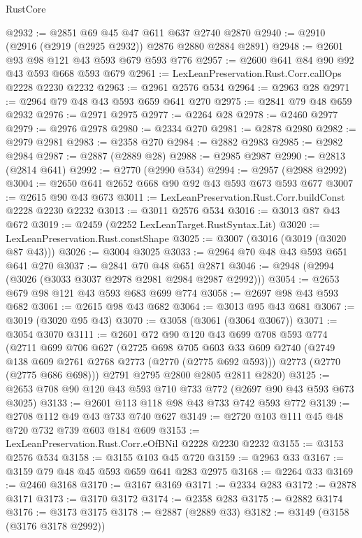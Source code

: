 \begin{lexlean}{RustCore}
\begin{coremodule}
@2932 := @2851 @69 @45 @47 @611 @637 @2740 @2870
@2940 := @2910 (@2916 (@2919 (@2925 @2932)) @2876 @2880 @2884 @2891)
@2948 := @2601 @93 @98 @121 @43 @593 @679 @593 @776
@2957 := @2600 @641 @84 @90 @92 @43 @593 @668 @593 @679
@2961 := LexLeanPreservation.Rust.Corr.callOps @2228 @2230 @2232
@2963 := @2961 @2576 @534
@2964 := @2963 @28
@2971 := @2964 @79 @48 @43 @593 @659 @641 @270
@2975 := @2841 @79 @48 @659 @2932
@2976 := @2971 @2975
@2977 := @2264 @28
@2978 := @2460 @2977
@2979 := @2976 @2978
@2980 := @2334 @270
@2981 := @2878 @2980
@2982 := @2979 @2981
@2983 := @2358 @270
@2984 := @2882 @2983
@2985 := @2982 @2984
@2987 := @2887 (@2889 @28)
@2988 := @2985 @2987
@2990 := @2813 (@2814 @641)
@2992 := @2770 (@2990 @534)
@2994 := @2957 (@2988 @2992)
@3004 := @2650 @641 @2652 @668 @90 @92 @43 @593 @673 @593 @677
@3007 := @2615 @90 @43 @673
@3011 := LexLeanPreservation.Rust.Corr.buildConst @2228 @2230 @2232
@3013 := @3011 @2576 @534
@3016 := @3013 @87 @43 @672
@3019 := @2459 (@2252 LexLeanTarget.RustSyntax.Lit)
@3020 := LexLeanPreservation.Rust.constShape
@3025 := @3007 (@3016 (@3019 (@3020 @87 @43)))
@3026 := @3004 @3025
@3033 := @2964 @70 @48 @43 @593 @651 @641 @270
@3037 := @2841 @70 @48 @651 @2871
@3046 := @2948 (@2994 (@3026 (@3033 @3037 @2978 @2981 @2984 @2987 @2992)))
@3054 := @2653 @679 @98 @121 @43 @593 @683 @699 @774
@3058 := @2697 @98 @43 @593 @682
@3061 := @2615 @98 @43 @682
@3064 := @3013 @95 @43 @681
@3067 := @3019 (@3020 @95 @43)
@3070 := @3058 (@3061 (@3064 @3067))
@3071 := @3054 @3070
@3111 := @2601
    @72
    @90
    @120
    @43
    @699
    @708
    @593
    @774
    (@2711
      @699
      @706
      @627
      (@2725
        @698
        @705
        @603
        @33
        @609
        @2740
        (@2749 @138 @609 @2761 @2768 @2773 (@2770 (@2775 @692 @593)))
        @2773
        (@2770 (@2775 @686 @698)))
      @2791
      @2795
      @2800
      @2805
      @2811
      @2820)
@3125 := @2653 @708 @90 @120 @43 @593 @710 @733 @772 (@2697 @90 @43 @593 @673 @3025)
@3133 := @2601 @113 @118 @98 @43 @733 @742 @593 @772
@3139 := @2708 @112 @49 @43 @733 @740 @627
@3149 := @2720 @103 @111 @45 @48 @720 @732 @739 @603 @184 @609
@3153 := LexLeanPreservation.Rust.Corr.eOfBNil @2228 @2230 @2232
@3155 := @3153 @2576 @534
@3158 := @3155 @103 @45 @720
@3159 := @2963 @33
@3167 := @3159 @79 @48 @45 @593 @659 @641 @283 @2975
@3168 := @2264 @33
@3169 := @2460 @3168
@3170 := @3167 @3169
@3171 := @2334 @283
@3172 := @2878 @3171
@3173 := @3170 @3172
@3174 := @2358 @283
@3175 := @2882 @3174
@3176 := @3173 @3175
@3178 := @2887 (@2889 @33)
@3182 := @3149 (@3158 (@3176 @3178 @2992))

\end{coremodule}
\end{lexlean}
